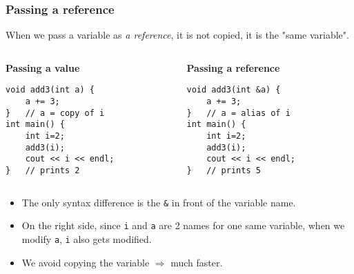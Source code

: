 \documentclass[12pt]{beamer}
\begin{document}
\begin{frame}[fragile]
\frametitle{Passing a reference}
When we pass a variable as \emph{a reference}, it is not copied, it is the "same variable".
\vspace{3pt}
\begin{columns}[T]
\begin{column}{.45\textwidth}
\textbf{Passing a value}
\begin{lstlisting}
void add3(int a) {
    a += 3;
}   // a = copy of i
int main() {
    int i=2;
    add3(i);
    cout << i << endl;
}   // prints 2
\end{lstlisting}
\end{column}
\begin{column}{.45\textwidth}
\textbf{Passing a reference}
\begin{lstlisting}
void add3(int &a) {
    a += 3;
}   // a = alias of i
int main() {
    int i=2;
    add3(i);
    cout << i << endl;
}   // prints 5
\end{lstlisting}
\end{column}
\end{columns}
\vspace{3pt}
\begin{itemize}
\item The only syntax difference is the \lstinline|&| in front of the variable name.
\item On the right side, since \lstinline|i| and \lstinline|a| are 2 names for one same variable, when we modify \lstinline|a|, \lstinline|i| also gets modified.
\item We avoid copying the variable $\Rightarrow$ much faster.
\end{itemize}
\end{frame}
\end{document}
